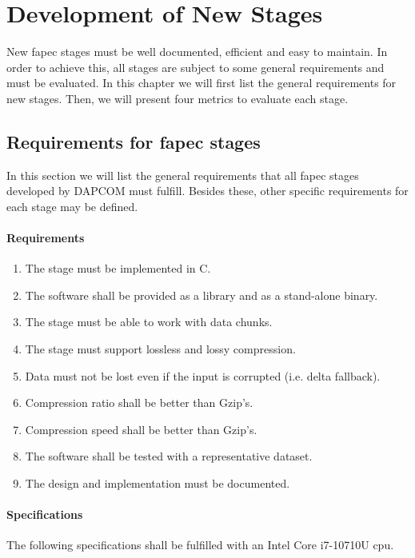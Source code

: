 \chapter{Development of New Stages} \label{ch:new_stages}
New \acrshort{fapec} stages must be well documented, efficient and easy to maintain. In order to achieve this, all stages are subject to some general requirements and must be evaluated. In this chapter we will first list the general requirements for new stages. Then, we will present four metrics to evaluate each stage.

\section{Requirements for \acrshort{fapec} stages} \label{sec:fapec_reqs}
In this section we will list the general requirements that all \acrshort{fapec} stages developed by DAPCOM must fulfill. Besides these, other specific requirements for each stage may be defined.

\subsubsection{Requirements} \label{sec:requirements}
\begin{enumerate}
	\item The stage must be implemented in C. \label{req:c}
	\item The software shall be provided as a library and as a stand-alone binary. \label{req:lib_bin}
	\item The stage must be able to work with data chunks. \label{req:chunks}
	\item The stage must support lossless and lossy compression.
	\item Data must not be lost even if the input is corrupted (i.e. delta fallback).
	\item Compression ratio shall be better than Gzip's.
	\item Compression speed shall be better than Gzip's.
	\item The software shall be tested with a representative dataset.
	\item The design and implementation must be documented.
\end{enumerate}

\subsubsection{Specifications}
The following specifications shall be fulfilled with an Intel Core i7-10710U \acrshort{cpu}.


